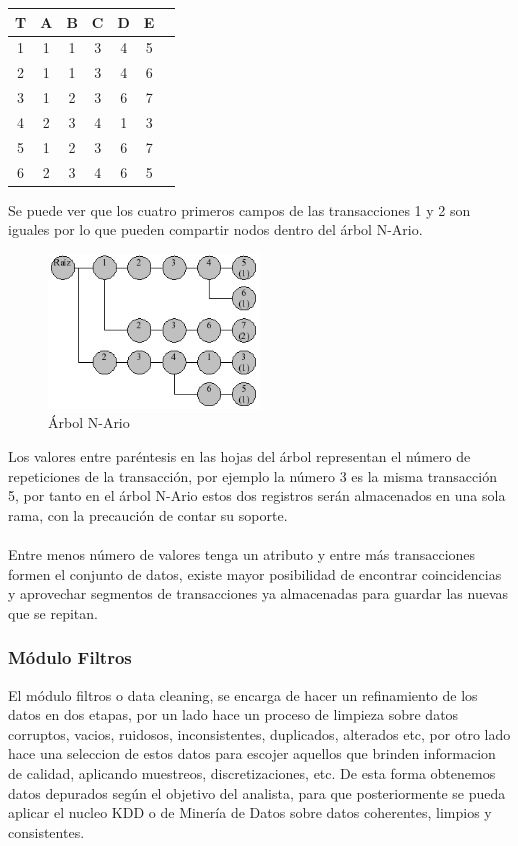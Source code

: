 \begin{center}
\begin{tabular}{|c|c|c|c|c|c|c|} \hline
\textbf{T} & \textbf{A} & \textbf{B} & \textbf{C} & \textbf{D} & \textbf{E} \\ \hline
1 & 1 & 1 & 3 & 4 & 5 \\ \hline
2 & 1 & 1 & 3 & 4 & 6 \\ \hline
3 & 1 & 2 & 3 & 6 & 7 \\ \hline
4 & 2 & 3 & 4 & 1 & 3 \\ \hline
5 & 1 & 2 & 3 & 6 & 7 \\ \hline
6 & 2 & 3 & 4 & 6 & 5 \\ \hline
\end{tabular}
\end{center}

Se puede ver que los cuatro primeros campos de las transacciones 1 y 2 son iguales por lo que pueden compartir
nodos dentro del \'arbol N-Ario. 

\begin{figure}[ht]
\centering
\includegraphics[width=0.5\textwidth]{images/nario2.png}
\caption{\'Arbol N-Ario}
\end{figure}

Los valores entre par\'entesis en las hojas del \'arbol representan el n\'umero de repeticiones de la
transacci\'on, por ejemplo la n\'umero 3 es la misma transacci\'on 5, por tanto en el \'arbol N-Ario estos dos
registros ser\'an almacenados en una sola rama, con la precauci\'on de contar su soporte.\\
\\
Entre menos n\'umero de valores tenga un atributo y entre m\'as transacciones formen el conjunto de datos, existe
mayor posibilidad de encontrar coincidencias y aprovechar segmentos de transacciones ya almacenadas para guardar
las nuevas que se repitan.\\

\subsubsection{M\'odulo Filtros}
El m\'odulo filtros o data cleaning, se encarga de hacer un refinamiento de los datos en  dos etapas, por un lado
hace un proceso de limpieza sobre datos corruptos, vacios, ruidosos, inconsistentes, duplicados, alterados etc,
por otro lado hace una seleccion de estos datos para escojer aquellos que brinden informacion de calidad,
aplicando muestreos, discretizaciones, etc. De esta forma obtenemos datos depurados seg\'un el objetivo del
analista, para que posteriormente se pueda aplicar el nucleo KDD o de Miner\'ia de Datos sobre datos coherentes,
limpios y consistentes.

